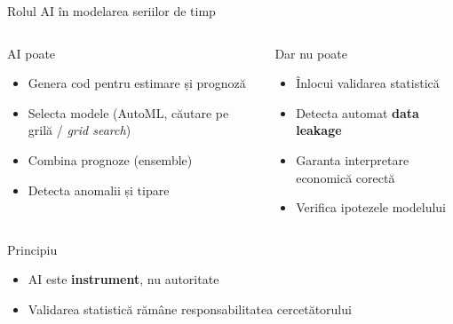 \documentclass[9pt, aspectratio=169, t]{beamer}
\begin{document}
\begin{frame}{Rolul AI în modelarea seriilor de timp}
    \begin{columns}[T]
        \begin{exampleblock}{AI poate}
            \begin{itemize}\setlength{\itemsep}{0pt}
                \item Genera cod pentru estimare și prognoză
                \item Selecta modele (AutoML, căutare pe grilă / \emph{grid search})
                \item Combina prognoze (ensemble)
                \item Detecta anomalii și tipare
            \end{itemize}
        \end{exampleblock}

        \begin{alertblock}{Dar nu poate}
            \begin{itemize}\setlength{\itemsep}{0pt}
                \item Înlocui validarea statistică
                \item Detecta automat \textbf{data leakage}
                \item Garanta interpretare economică corectă
                \item Verifica ipotezele modelului
            \end{itemize}
        \end{alertblock}
    \end{columns}

    \vspace{0.3cm}

    \begin{block}{Principiu}
        \begin{itemize}\setlength{\itemsep}{0pt}
            \item AI este \textbf{instrument}, nu autoritate
            \item Validarea statistică rămâne responsabilitatea cercetătorului
        \end{itemize}
    \end{block}
\end{frame}
\end{document}
